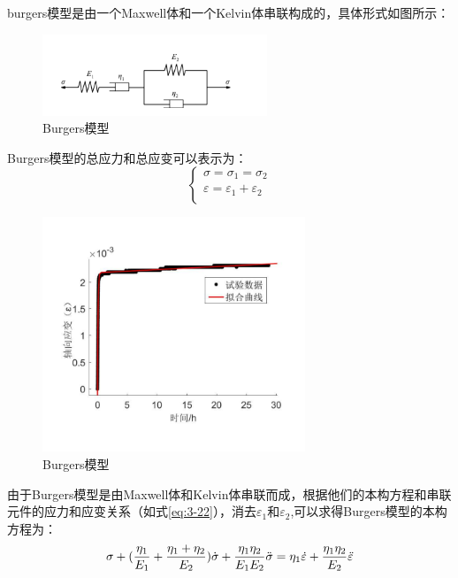 burgers模型是由一个Maxwell体和一个Kelvin体串联构成的，具体形式如图所示：
\begin{figure}[ht!]
    \centering
            \centering
            \includegraphics[width=0.6\textwidth]{img/chap3/Burgers.png}
    \caption{Burgers模型}
    \label{fig:3-8}
\end{figure}
Burgers模型的总应力和总应变可以表示为：
\begin{equation}
    \left\{\begin{matrix}
               \sigma=\sigma_1=\sigma_2  \\
               \varepsilon = \varepsilon_1+\varepsilon_2\\
    \end{matrix}\right.
    \label{eq:3-22}
\end{equation}

\begin{figure}[ht!]
    \centering
            \centering
            \includegraphics[width=0.7\textwidth]{img/chap3/C-01.pdf}
    \caption{Burgers模型}
    \label{fig:3-9}
\end{figure}




由于Burgers模型是由Maxwell体和Kelvin体串联而成，根据他们的本构方程和串联元件的应力和应变关系（如式\ref{eq:3-22}），消去$\varepsilon_1$和$\varepsilon_2$,可以求得Burgers模型的本构方程为：
\begin{equation}
    \sigma+(\frac{\eta_1}{E_1}+\frac{\eta_1+\eta_2}{E_2})\dot{\sigma}+\frac{\eta_1\eta_2}{E_1E_2}\ddot{\sigma}={\eta_1}{\dot{\varepsilon}}+\frac{\eta_1\eta_2}{E_2}\Ddot{\varepsilon}
    \label{eq:3-23}
\end{equation}

